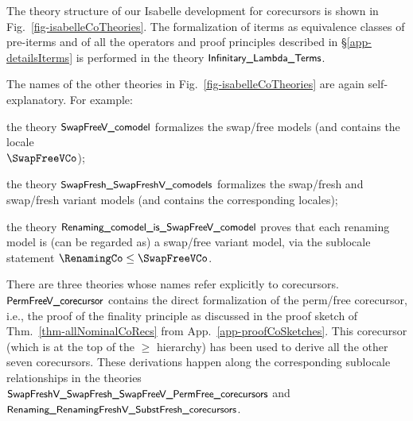 \newcommand\ParallelSubstitution
{\small \textsf{Parallel$\_$\allowbreak{}Substitution}}
\newcommand\InfinitaryLambdaTerms
{\small \textsf{Infinitary$\_$\allowbreak{}Lambda$\_$\allowbreak{}Terms}}
\newcommand\CoSwapSeveral
{\small \textsf{SwapFresh$\_$\allowbreak{}SwapFreshV$\_$\allowbreak{}comodels}}
\newcommand\RenamingIsSwapFreeV
{\small \textsf{Renaming$\_$\allowbreak{}comodel$\_$\allowbreak{}is$\_$\allowbreak{}SwapFreeV$\_$\allowbreak{}comodel}}


\newcommand\CoPermFreeVR
{\small \textsf{PermFreeV$\_$\allowbreak{}corecursor}}

\newcommand\CoSeveralR
{\small \textsf{SwapFreshV$\_$\allowbreak{}SwapFresh$\_$\allowbreak{}SwapFreeV$\_$\allowbreak{}PermFree$\_$\allowbreak{}corecursors}}

\newcommand\CoSeveralTR
{\small \textsf{Renaming$\_$\allowbreak{}RenamingFreshV$\_$\allowbreak{}SubstFresh$\_$\allowbreak{}corecursors}}

\newcommand\CoSwapFreeV{\small \textsf{SwapFreeV$\_$\allowbreak{}comodel}}


The theory structure of our Isabelle development for corecursors is shown in Fig.~\ref{fig-isabelleCoTheories}.  
The formalization of iterms as equivalence classes of pre-iterms and of all the operators and proof principles described in \S\ref{app-detailsIterms} is performed in the theory $\InfinitaryLambdaTerms$. 


The names of the  other theories in Fig.~\ref{fig-isabelleCoTheories} are again
self-explanatory. For example:
\begin{mmyitem}
	\item the theory $\CoSwapFreeV$ formalizes the swap/free models (and contains the locale \\ $\SwapFreeVCo$); 
		
	\item the theory $\CoSwapSeveral$ formalizes the swap/fresh and swap/fresh variant models (and contains the corresponding locales); 

	\item the theory $\RenamingIsSwapFreeV$ proves that each renaming model is (can be regarded as) a swap/free variant model, via the sublocale statement $\RenamingCo \leq \SwapFreeVCo$. 
\end{mmyitem}

There are three theories whose names refer explicitly to  corecursors.  
$\CoPermFreeVR$ contains the direct formalization of the perm/free corecursor, i.e., the proof of the finality principle as discussed in the proof sketch of Thm.~\ref{thm-allNominalCoRecs}
from App.~\ref{app-proofCoSketches}. This corecursor (which is at the top of the $\geq$ hierarchy) has been used to derive all the other seven corecursors. These derivations happen along the corresponding sublocale relationships in the theories 
\\$\CoSeveralR$ and \\$\CoSeveralTR$.

